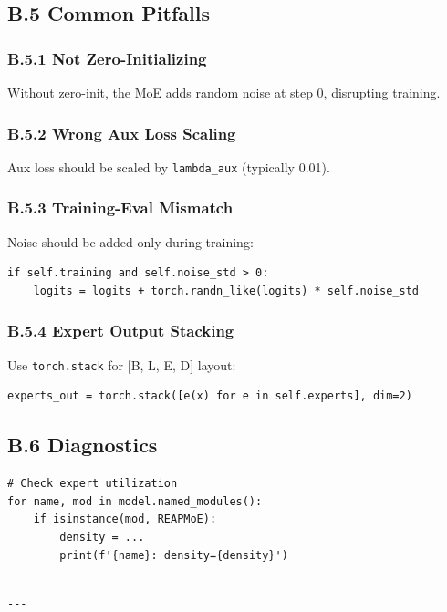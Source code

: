 \subsection{B.5 Common Pitfalls}

\subsubsection{B.5.1 Not Zero-Initializing}

Without zero-init, the MoE adds random noise at step 0, disrupting training.

\subsubsection{B.5.2 Wrong Aux Loss Scaling}

Aux loss should be scaled by \texttt{lambda\_aux} (typically 0.01).

\subsubsection{B.5.3 Training-Eval Mismatch}

Noise should be added only during training:

\begin{lstlisting}
if self.training and self.noise_std > 0:
    logits = logits + torch.randn_like(logits) * self.noise_std
\end{lstlisting}

\subsubsection{B.5.4 Expert Output Stacking}

Use \texttt{torch.stack} for [B, L, E, D] layout:

\begin{lstlisting}
experts_out = torch.stack([e(x) for e in self.experts], dim=2)
\end{lstlisting}

\subsection{B.6 Diagnostics}

\begin{lstlisting}
# Check expert utilization
for name, mod in model.named_modules():
    if isinstance(mod, REAPMoE):
        density = ...
        print(f'{name}: density={density}')
\end{lstlisting}
\begin{lstlisting}

---
\end{lstlisting}

